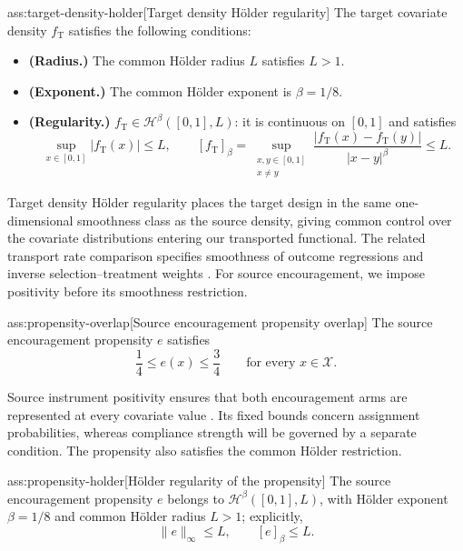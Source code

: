 \begin{assumptionv}{ass:target-density-holder}[Target density Hölder regularity]
The target covariate density \(f_{\mathrm T}\) satisfies the following conditions:
\begin{itemize}
\item \textbf{(Radius.)} The common Hölder radius \(L\) satisfies \(L>1\).
\item \textbf{(Exponent.)} The common Hölder exponent is \(\beta=1/8\).
\item \textbf{(Regularity.)} \(f_{\mathrm T}\in\mathcal H^\beta([0,1],L)\): it is continuous on \([0,1]\) and satisfies
\[
\sup_{x\in[0,1]}|f_{\mathrm T}(x)|\le L,
\qquad
[f_{\mathrm T}]_\beta
=
\sup_{\substack{x,y\in[0,1]\\x\ne y}}
\frac{|f_{\mathrm T}(x)-f_{\mathrm T}(y)|}{|x-y|^\beta}
\le L.
\]
\end{itemize}
\end{assumptionv}

Target density Hölder regularity places the target design in the same one-dimensional smoothness class as the source density, giving common control over the covariate distributions entering our transported functional. The related transport rate comparison specifies smoothness of outcome regressions and inverse selection--treatment weights \citep{ZengKennedyBodnarNaimi2025Efficient}. For source encouragement, we impose positivity before its smoothness restriction.

\begin{assumptionv}{ass:propensity-overlap}[Source encouragement propensity overlap]
The source encouragement propensity \(e\) satisfies
\[
\frac14\le e(x)\le\frac34
\qquad\text{for every }x\in\mathcal X.
\]
\end{assumptionv}

Source instrument positivity ensures that both encouragement arms are represented at every covariate value \citep{ChenHuang2025Generalizing}. Its fixed bounds concern assignment probabilities, whereas compliance strength will be governed by a separate condition. The propensity also satisfies the common Hölder restriction.

\begin{assumptionv}{ass:propensity-holder}[Hölder regularity of the propensity]
The source encouragement propensity \(e\) belongs to \(\mathcal H^\beta([0,1],L)\), with Hölder exponent \(\beta=1/8\) and common Hölder radius \(L>1\); explicitly,
\[
\lVert e\rVert_\infty\le L,
\qquad
[e]_\beta\le L.
\]
\end{assumptionv}

